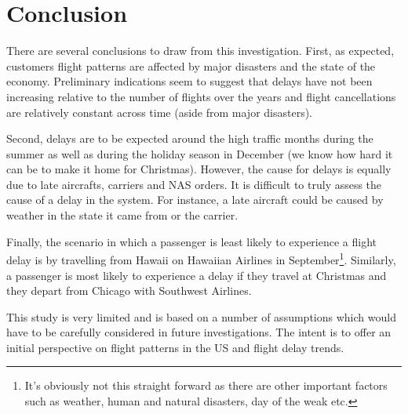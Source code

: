 \documentclass[11pt,twoside,titlepage]{article}
\begin{document}
\section{Conclusion}

There are several conclusions to draw from this investigation. First, as expected, customers flight patterns are affected by major disasters and  the state of the economy. Preliminary indications seem to suggest that delays have not been increasing relative to the number of flights over the years and flight cancellations are relatively constant across time (aside from major disasters).

Second, delays are to be expected around the high traffic months during the summer as well as during the holiday season in December (we know how hard it can be to make it home for Christmas). However, the cause for delays is equally due to late aircrafts, carriers and NAS orders. It is difficult to truly assess the cause of a delay in the system. For instance, a late aircraft could be caused by weather in the state it came from or the carrier.

Finally, the scenario in which a passenger is least likely to experience a flight delay is by travelling from Hawaii on Hawaiian Airlines in September\footnote{It's obviously not this straight forward as there are other important factors such as weather, human and natural disasters, day of the weak etc.}. Similarly, a passenger is most likely to experience a delay if they travel at Christmas and they depart from Chicago with Southwest Airlines.

This study is very limited and is based on a number of assumptions which would have to be carefully considered in future investigations. The intent is to offer an initial perspective on flight patterns in the US and flight delay trends.

\clearpage
\break
\newpage
\end{document}
